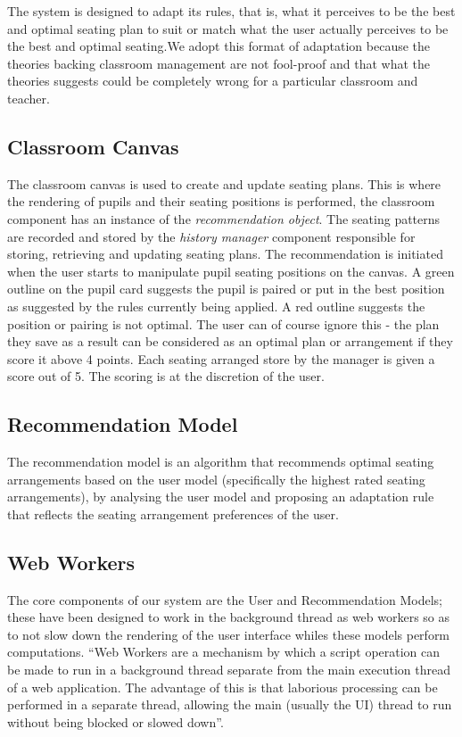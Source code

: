 The system is designed to adapt its rules, that is, what it perceives to be the best and optimal seating plan to suit or match what the user actually perceives to be the best and optimal seating.We adopt this format of adaptation because the theories backing classroom management are not fool-proof and that what the theories suggests could be completely wrong for a particular classroom and teacher.

\subsection{Classroom Canvas} \label{sub:classroom}
The classroom canvas is used to create and update seating plans. This is where the rendering of pupils and their seating positions is performed, the classroom component has an instance of the \emph{recommendation object}. The seating patterns are recorded and stored by the \emph{history manager} component responsible for storing, retrieving and updating seating plans. The recommendation is initiated when the user starts to manipulate pupil seating positions on the canvas. A green outline on the pupil card suggests the pupil is paired or put in the best position as suggested by the rules currently being applied. A red outline suggests the position or pairing is not optimal. The user can of course ignore this - the plan they save as a result can be considered as an optimal plan or arrangement if they score it above 4 points. Each seating arranged store by the manager is given a score out of 5. The scoring is at the discretion of the user.

\subsection{Recommendation Model} \label{sub:RM}
The recommendation model is an algorithm that recommends optimal seating arrangements based on the user model (specifically the highest rated seating arrangements), by analysing the user model and proposing an adaptation rule that reflects the seating arrangement preferences of the user. 

\subsection{Web Workers} \label{sub:webworkers}
The core components of our system are the User and Recommendation Models; these have been designed to work in the background thread as web workers so as to not slow down the rendering of the user interface whiles these models perform computations. ``Web Workers are a mechanism by which a script operation can be made to run in a background thread separate from the main execution thread of a web application. The advantage of this is that laborious processing can be performed in a separate thread, allowing the main (usually the UI) thread to run without being blocked or slowed down''.\cite{website:Mozilla-WebWorkers}
